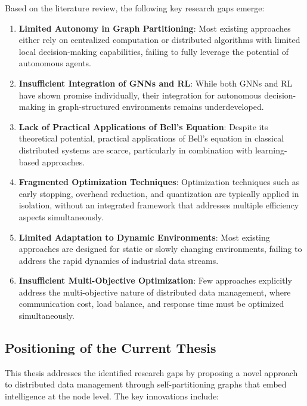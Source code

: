 \documentclass{article}
\begin{document}
Based on the literature review, the following key research gaps emerge:

\begin{enumerate}
    \item \textbf{Limited Autonomy in Graph Partitioning}: Most existing approaches either rely on centralized computation or distributed algorithms with limited local decision-making capabilities, failing to fully leverage the potential of autonomous agents.
    
    \item \textbf{Insufficient Integration of GNNs and RL}: While both GNNs and RL have shown promise individually, their integration for autonomous decision-making in graph-structured environments remains underdeveloped.
    
    \item \textbf{Lack of Practical Applications of Bell's Equation}: Despite its theoretical potential, practical applications of Bell's equation in classical distributed systems are scarce, particularly in combination with learning-based approaches.
    
    \item \textbf{Fragmented Optimization Techniques}: Optimization techniques such as early stopping, overhead reduction, and quantization are typically applied in isolation, without an integrated framework that addresses multiple efficiency aspects simultaneously.
    
    \item \textbf{Limited Adaptation to Dynamic Environments}: Most existing approaches are designed for static or slowly changing environments, failing to address the rapid dynamics of industrial data streams.
    
    \item \textbf{Insufficient Multi-Objective Optimization}: Few approaches explicitly address the multi-objective nature of distributed data management, where communication cost, load balance, and response time must be optimized simultaneously.
\end{enumerate}

\subsection{Positioning of the Current Thesis}

This thesis addresses the identified research gaps by proposing a novel approach to distributed data management through self-partitioning graphs that embed intelligence at the node level. The key innovations include:
\end{document}
